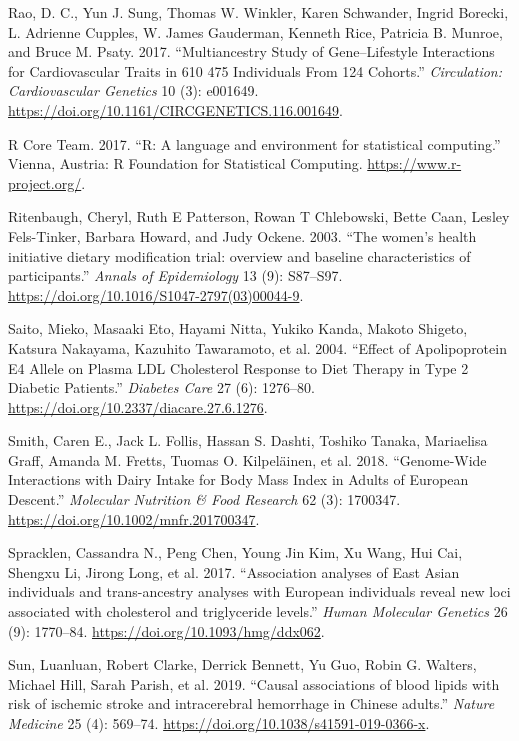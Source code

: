 \documentclass[]{article}
\begin{document}
\leavevmode\hypertarget{ref-Rao2017}{}%
Rao, D. C., Yun J. Sung, Thomas W. Winkler, Karen Schwander, Ingrid
Borecki, L. Adrienne Cupples, W. James Gauderman, Kenneth Rice, Patricia
B. Munroe, and Bruce M. Psaty. 2017. ``Multiancestry Study of
Gene--Lifestyle Interactions for Cardiovascular Traits in 610 475
Individuals From 124 Cohorts.'' \emph{Circulation: Cardiovascular
Genetics} 10 (3): e001649.
\url{https://doi.org/10.1161/CIRCGENETICS.116.001649}.

\leavevmode\hypertarget{ref-RCoreTeam2017}{}%
R Core Team. 2017. ``R: A language and environment for statistical
computing.'' Vienna, Austria: R Foundation for Statistical Computing.
\url{https://www.r-project.org/}.

\leavevmode\hypertarget{ref-Ritenbaugh2003}{}%
Ritenbaugh, Cheryl, Ruth E Patterson, Rowan T Chlebowski, Bette Caan,
Lesley Fels-Tinker, Barbara Howard, and Judy Ockene. 2003. ``The women's
health initiative dietary modification trial: overview and baseline
characteristics of participants.'' \emph{Annals of Epidemiology} 13 (9):
S87--S97. \url{https://doi.org/10.1016/S1047-2797(03)00044-9}.

\leavevmode\hypertarget{ref-Saito2004}{}%
Saito, Mieko, Masaaki Eto, Hayami Nitta, Yukiko Kanda, Makoto Shigeto,
Katsura Nakayama, Kazuhito Tawaramoto, et al. 2004. ``Effect of
Apolipoprotein E4 Allele on Plasma LDL Cholesterol Response to Diet
Therapy in Type 2 Diabetic Patients.'' \emph{Diabetes Care} 27 (6):
1276--80. \url{https://doi.org/10.2337/diacare.27.6.1276}.

\leavevmode\hypertarget{ref-Smith2018}{}%
Smith, Caren E., Jack L. Follis, Hassan S. Dashti, Toshiko Tanaka,
Mariaelisa Graff, Amanda M. Fretts, Tuomas O. Kilpeläinen, et al. 2018.
``Genome-Wide Interactions with Dairy Intake for Body Mass Index in
Adults of European Descent.'' \emph{Molecular Nutrition \& Food
Research} 62 (3): 1700347. \url{https://doi.org/10.1002/mnfr.201700347}.

\leavevmode\hypertarget{ref-Spracklen2017}{}%
Spracklen, Cassandra N., Peng Chen, Young Jin Kim, Xu Wang, Hui Cai,
Shengxu Li, Jirong Long, et al. 2017. ``Association analyses of East
Asian individuals and trans-ancestry analyses with European individuals
reveal new loci associated with cholesterol and triglyceride levels.''
\emph{Human Molecular Genetics} 26 (9): 1770--84.
\url{https://doi.org/10.1093/hmg/ddx062}.

\leavevmode\hypertarget{ref-Sun2019a}{}%
Sun, Luanluan, Robert Clarke, Derrick Bennett, Yu Guo, Robin G. Walters,
Michael Hill, Sarah Parish, et al. 2019. ``Causal associations of blood
lipids with risk of ischemic stroke and intracerebral hemorrhage in
Chinese adults.'' \emph{Nature Medicine} 25 (4): 569--74.
\url{https://doi.org/10.1038/s41591-019-0366-x}.
\end{document}
